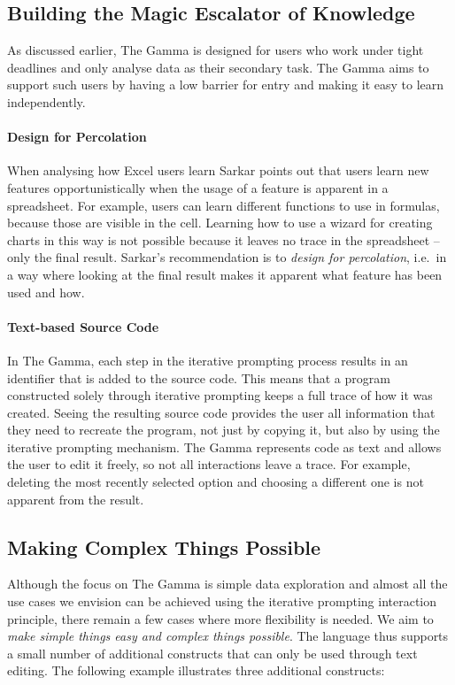 \documentclass[manuscript,review,anonymous]{acmart}
\begin{document}
\subsection{Building the Magic Escalator of Knowledge}
As discussed earlier, The Gamma is designed for users who work under tight deadlines and only
analyse data as their secondary task. The Gamma aims to support such users by having a low
barrier for entry and making it easy to learn independently.

\paragraph{Design for Percolation}
When analysing how Excel users learn Sarkar \cite{learning} points out that users learn new
features opportunistically when the usage of a feature is apparent in a spreadsheet. For
example, users can learn different functions to use in formulas, because those are visible in
the cell. Learning how to use a wizard for creating charts in this way is not possible because
it leaves no trace in the spreadsheet -- only the final result. Sarkar's recommendation is to
\emph{design for percolation}, i.e.~in a way where looking at the final result makes it apparent
what feature has been used and how.

\paragraph{Text-based Source Code}
In The Gamma, each step in the iterative prompting process results in an identifier that is
added to the source code. This means that a program constructed solely through iterative prompting
keeps a full trace of how it was created. Seeing the resulting source code provides the user all
information that they need to recreate the program, not just by copying it, but also by using the
iterative prompting mechanism. The Gamma represents code as text and allows the user to edit it
freely, so not all interactions leave a trace. For example, deleting the most recently selected
option and choosing a different one is not apparent from the result.

\subsection{Making Complex Things Possible}
Although the focus on The Gamma is simple data exploration and almost all the use cases we
envision can be achieved using the iterative prompting interaction principle, there remain a
few cases where more flexibility is needed. We aim to \emph{make simple things easy and
complex things possible}. The language thus supports a small number of additional constructs that
can only be used through text editing. The following example illustrates three additional
constructs:
\end{document}
